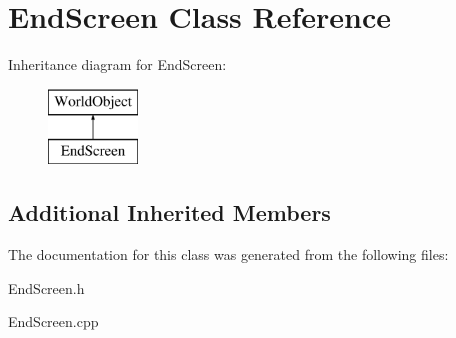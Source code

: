 \hypertarget{class_end_screen}{\section{End\+Screen Class Reference}
\label{class_end_screen}
}
Inheritance diagram for End\+Screen\+:\begin{figure}[H]
\begin{center}
\leavevmode
\includegraphics[height=2.000000cm]{class_end_screen}
\end{center}
\end{figure}
\subsection*{Additional Inherited Members}


The documentation for this class was generated from the following files\+:\begin{DoxyCompactItemize}
\item 
End\+Screen.\+h\item 
End\+Screen.\+cpp\end{DoxyCompactItemize}

